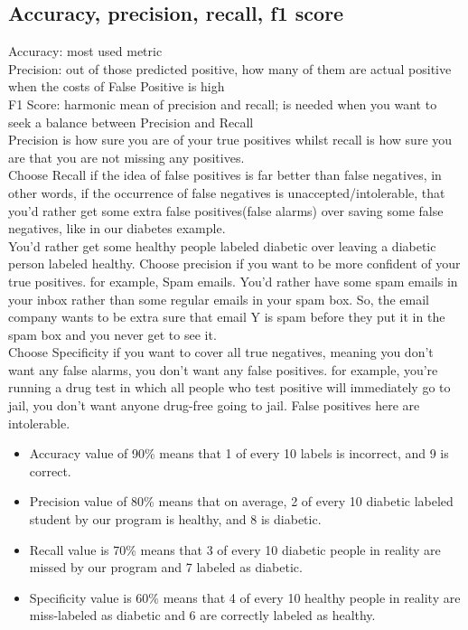 \documentclass{beamer}
\begin{document}
\subsection{Accuracy, precision, recall, f1 score}
\begin{frame}[allowframebreaks]
	Accuracy: most used metric\\
	Precision: out of those predicted positive, how many of them are actual positive\\
	when the costs of False Positive is high\\
	F1 Score: harmonic mean of precision and recall; is needed when you want to seek a balance between Precision and Recall\\
	Precision is how sure you are of your true positives whilst recall is how sure you are that you are not missing any positives.\\
	Choose Recall if the idea of false positives is far better than false negatives, in other words, if the occurrence of false negatives is unaccepted/intolerable, that you’d rather get some extra false positives(false alarms) over saving some false negatives, like in our diabetes example.\\
	You’d rather get some healthy people labeled diabetic over leaving a diabetic person labeled healthy.
	Choose precision if you want to be more confident of your true positives. for example, Spam emails. You’d rather have some spam emails in your inbox rather than some regular emails in your spam box. So, the email company wants to be extra sure that email Y is spam before they put it in the spam box and you never get to see it.\\
	Choose Specificity if you want to cover all true negatives, meaning you don’t want any false alarms, you don’t want any false positives. for example, you’re running a drug test in which all people who test positive will immediately go to jail, you don’t want anyone drug-free going to jail. False positives here are intolerable.\\
	\begin{itemize}
		\item Accuracy value of 90\% means that 1 of every 10 labels is incorrect, and 9 is correct.
		\item  Precision value of 80\% means that on average, 2 of every 10 diabetic labeled student by our program is healthy, and 8 is diabetic.
		\item Recall value is 70\% means that 3 of every 10 diabetic people in reality are missed by our program and 7 labeled as diabetic.
		\item Specificity value is 60\% means that 4 of every 10 healthy people in reality are miss-labeled as diabetic and 6 are correctly labeled as healthy.
	\end{itemize}
\end{frame}
\end{document}
